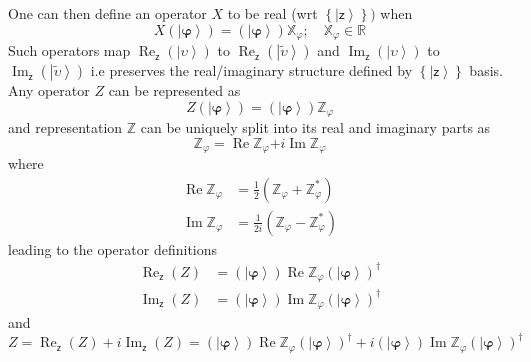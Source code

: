 \documentclass[aps,preprint]{revtex4}%
\begin{document}
One can then define an operator $X$ to be real (wrt $\left\{  \left\vert
\mathsf{z}\right\rangle \right\}  )$ when
\begin{equation}
X\left(  \left\vert \mathbf{\varphi}\right\rangle \right)  =\left(  \left\vert
\mathbf{\varphi}\right\rangle \right)  \mathbb{X}_{\varphi};\quad
\mathbb{X}_{\varphi}\mathbb{\in R} \label{con3}%
\end{equation}
Such operators map $\operatorname{Re}_{\mathsf{z}}\left(  \left\vert
\upsilon\right\rangle \right)  $ to $\operatorname{Re}_{\mathsf{z}}\left(
\left\vert \tilde{\upsilon}\right\rangle \right)  $ and $\operatorname{Im}%
_{\mathsf{z}}\left(  \left\vert \upsilon\right\rangle \right)  $ to
$\operatorname{Im}_{\mathsf{z}}\left(  \left\vert \tilde{\upsilon
}\right\rangle \right)  $ i.e preserves the real/imaginary structure defined
by $\left\{  \left\vert \mathsf{z}\right\rangle \right\}  $ basis. Any
operator $Z$ can be represented as
\begin{equation}
Z\left(  \left\vert \mathbf{\varphi}\right\rangle \right)  =\left(  \left\vert
\mathbf{\varphi}\right\rangle \right)  \mathbb{Z}_{\varphi}%
\end{equation}
and representation $\mathbb{Z}$ can be uniquely split into its real and
imaginary parts as
\begin{equation}
\mathbb{Z}_{\varphi}\mathbb{=}\operatorname{Re}\mathbb{Z}_{\varphi}%
\mathbb{+}i\operatorname{Im}\mathbb{Z}_{\varphi}%
\end{equation}
where
\begin{align}
\operatorname{Re}\mathbb{Z}_{\varphi}  &  \mathbb{=}\frac{1}{2}\left(
\mathbb{Z}_{\varphi}+\mathbb{Z}_{\varphi}^{\ast}\right) \nonumber\\
\operatorname{Im}\mathbb{Z}_{\varphi}  &  \mathbb{=}\frac{1}{2i}\left(
\mathbb{Z}_{\varphi}-\mathbb{Z}_{\varphi}^{\ast}\right)
\end{align}
leading to the operator definitions
\begin{align}
\operatorname{Re}_{\mathsf{z}}\left(  Z\right)   &  =\left(  \left\vert
\mathbf{\varphi}\right\rangle \right)  \operatorname{Re}\mathbb{Z}_{\varphi
}\left(  \left\vert \mathbf{\varphi}\right\rangle \right)  ^{\dagger
}\nonumber\\
\operatorname{Im}_{\mathsf{z}}\left(  Z\right)   &  =\left(  \left\vert
\mathbf{\varphi}\right\rangle \right)  \operatorname{Im}\mathbb{Z}_{\varphi
}\left(  \left\vert \mathbf{\varphi}\right\rangle \right)  ^{\dagger}%
\end{align}
and
\begin{equation}
Z=\operatorname{Re}_{\mathsf{z}}\left(  Z\right)  +i\operatorname{Im}%
_{\mathsf{z}}\left(  Z\right)  =\left(  \left\vert \mathbf{\varphi
}\right\rangle \right)  \operatorname{Re}\mathbb{Z}_{\varphi}\left(
\left\vert \mathbf{\varphi}\right\rangle \right)  ^{\dagger}+i\left(
\left\vert \mathbf{\varphi}\right\rangle \right)  \operatorname{Im}%
\mathbb{Z}_{\varphi}\left(  \left\vert \mathbf{\varphi}\right\rangle \right)
^{\dagger}%
\end{equation}
\end{document}
